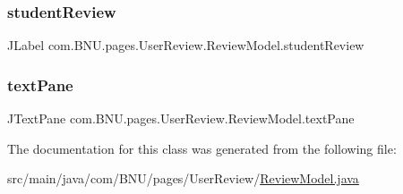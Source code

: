 \subsubsection{\texorpdfstring{student\+Review}{studentReview}}
{\footnotesize\ttfamily J\+Label com.\+B\+N\+U.\+pages.\+User\+Review.\+Review\+Model.\+student\+Review\hspace{0.3cm}{\ttfamily [private]}}

\mbox{\label{classcom_1_1_b_n_u_1_1pages_1_1_user_review_1_1_review_model_a64332dab97f2261d046f4dc5cba37f02}} 
\subsubsection{\texorpdfstring{text\+Pane}{textPane}}
{\footnotesize\ttfamily J\+Text\+Pane com.\+B\+N\+U.\+pages.\+User\+Review.\+Review\+Model.\+text\+Pane\hspace{0.3cm}{\ttfamily [private]}}



The documentation for this class was generated from the following file\+:\begin{DoxyCompactItemize}
\item 
src/main/java/com/\+B\+N\+U/pages/\+User\+Review/\mbox{\hyperlink{_user_review_2_review_model_8java}{Review\+Model.\+java}}\end{DoxyCompactItemize}
